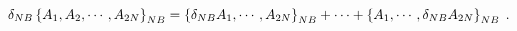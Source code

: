 \begin{equation}
\delta_{NB}\left\{  A_{1},A_{2},\cdots,A_{2N}\right\}  _{{\footnotesize NB}%
}=\left\{  \delta_{NB}A_{1},\cdots,A_{2N}\right\}  _{{\footnotesize NB}%
}+\cdots+\left\{  A_{1},\cdots,\delta_{NB}A_{2N}\right\}  _{{\footnotesize NB}%
}\;.
\end{equation}

